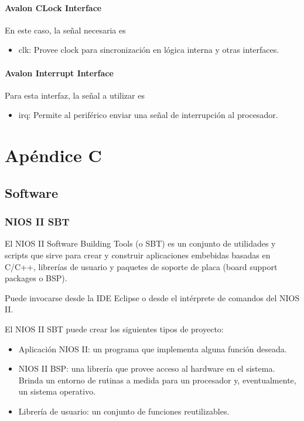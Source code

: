 \subsubsection{Avalon CLock Interface}
En este caso, la señal necesaria es
\begin{itemize}
	\item clk: Provee clock para sincronización en lógica interna y otras interfaces.
\end{itemize}

\subsubsection{Avalon Interrupt Interface}
Para esta interfaz, la señal a utilizar es

\begin{itemize}
	\item irq: Permite al periférico enviar una señal de interrupción al procesador.
\end{itemize}

\chapter{Apéndice C}

\section*{Software}

\subsection*{NIOS II SBT}

El NIOS II Software Building Tools (o SBT) es un conjunto de utilidades y scripts que sirve para crear y construir aplicaciones embebidas basadas en C/C++, librerías de usuario y paquetes de soporte de placa (board support packages o BSP). 

Puede invocarse desde la IDE Eclipse o desde el intérprete de comandos del NIOS II.

El NIOS II SBT puede crear los siguientes tipos de proyecto:
\begin{itemize}
	\item Aplicación NIOS II: un programa que implementa alguna función deseada.
	\item NIOS II BSP: una librería que provee acceso al hardware en el sistema. Brinda un entorno de rutinas a medida para un procesador y, eventualmente, un sistema operativo. 
	\item Librería de usuario: un conjunto de funciones reutilizables. 
\end{itemize}


